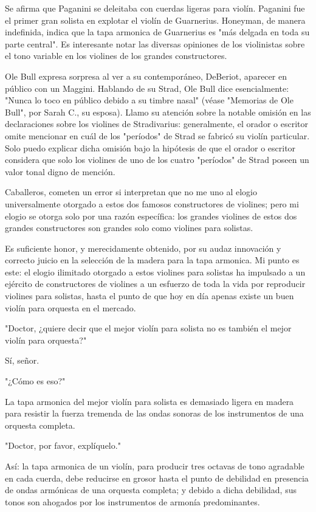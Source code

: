 \documentclass[12pt]{book}
\begin{document}
Se afirma que Paganini se deleitaba con cuerdas ligeras para violín. Paganini fue el primer gran solista en explotar el violín de Guarnerius. Honeyman, de manera indefinida, indica que la tapa armonica de Guarnerius es "más delgada en toda su parte central". Es interesante notar las diversas opiniones de los violinistas sobre el tono variable en los violines de los grandes constructores.

Ole Bull expresa sorpresa al ver a su contemporáneo, DeBeriot, aparecer en público con un Maggini. Hablando de su Strad, Ole Bull dice esencialmente: "Nunca lo toco en público debido a su timbre nasal" (véase "Memorias de Ole Bull", por Sarah C., su esposa). Llamo su atención sobre la notable omisión en las declaraciones sobre los violines de Stradivarius: generalmente, el orador o escritor omite mencionar en cuál de los "períodos" de Strad se fabricó su violín particular. Solo puedo explicar dicha omisión bajo la hipótesis de que el orador o escritor considera que solo los violines de uno de los cuatro "períodos" de Strad poseen un valor tonal digno de mención.

Caballeros, cometen un error si interpretan que no me uno al elogio universalmente otorgado a estos dos famosos constructores de violines; pero mi elogio se otorga solo por una razón específica: los grandes violines de estos dos grandes constructores son grandes solo como violines para solistas.

Es suficiente honor, y merecidamente obtenido, por su audaz innovación y correcto juicio en la selección de la madera para la tapa armonica. Mi punto es este: el elogio ilimitado otorgado a estos violines para solistas ha impulsado a un ejército de constructores de violines a un esfuerzo de toda la vida por reproducir violines para solistas, hasta el punto de que hoy en día apenas existe un buen violín para orquesta en el mercado.

"Doctor, ¿quiere decir que el mejor violín para solista no es también el mejor violín para orquesta?"

Sí, señor.

"¿Cómo es eso?"

La tapa armonica del mejor violín para solista es demasiado ligera en madera para resistir la fuerza tremenda de las ondas sonoras de los instrumentos de una orquesta completa.

"Doctor, por favor, explíquelo."

Así: la tapa armonica de un violín, para producir tres octavas de tono agradable en cada cuerda, debe reducirse en grosor hasta el punto de debilidad en presencia de ondas armónicas de una orquesta completa; y debido a dicha debilidad, sus tonos son ahogados por los instrumentos de armonía predominantes.
\end{document}
